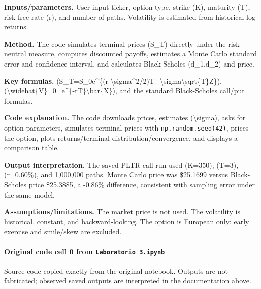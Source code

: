 \documentclass[
  11pt,
]{article}
\begin{document}
\textbf{Inputs/parameters.} User-input ticker, option type, strike (K), maturity (T), risk-free rate (r), and number of paths. Volatility is estimated from historical log returns.

\textbf{Method.} The code simulates terminal prices (S\_T) directly under the risk-neutral measure, computes discounted payoffs, estimates a Monte Carlo standard error and confidence interval, and calculates Black-Scholes (d\_1,d\_2) and price.

\textbf{Key formulas.} (S\_T=S\_0e\^{}\{(r-\textbackslash sigma\^{}2/2)T+\textbackslash sigma\textbackslash sqrt\{T\}Z\}), (\textbackslash widehat\{V\}\_0=e\^{}\{-rT\}\textbackslash bar\{X\}), and the standard Black-Scholes call/put formulas.

\textbf{Code explanation.} The code downloads prices, estimates (\textbackslash sigma), asks for option parameters, simulates terminal prices with \texttt{np.random.seed(42)}, prices the option, plots returns/terminal distribution/convergence, and displays a comparison table.

\textbf{Output interpretation.} The saved PLTR call run used (K=350), (T=3), (r=0.60\%), and 1,000,000 paths. Monte Carlo price was \$25.1699 versus Black-Scholes price \$25.3885, a -0.86\% difference, consistent with sampling error under the same model.

\textbf{Assumptions/limitations.} The market price is not used. The volatility is historical, constant, and backward-looking. The option is European only; early exercise and smile/skew are excluded.

\paragraph{\texorpdfstring{Original code cell 0 from \texttt{Laboratorio\ 3.ipynb}}{Original code cell 0 from Laboratorio 3.ipynb}}\label{original-code-cell-0-from-laboratorio-3ipynb}

Source code copied exactly from the original notebook. Outputs are not fabricated; observed saved outputs are interpreted in the documentation above.
\end{document}
